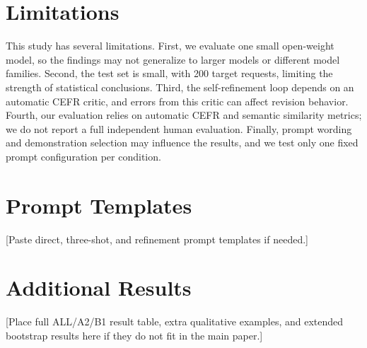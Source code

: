 \documentclass[11pt]{article}
\begin{document}
\section*{Limitations}

This study has several limitations. First, we evaluate one small open-weight model, so the findings may not generalize to larger models or different model families. Second, the test set is small, with 200 target requests, limiting the strength of statistical conclusions. Third, the self-refinement loop depends on an automatic CEFR critic, and errors from this critic can affect revision behavior. Fourth, our evaluation relies on automatic CEFR and semantic similarity metrics; we do not report a full independent human evaluation. Finally, prompt wording and demonstration selection may influence the results, and we test only one fixed prompt configuration per condition.



\appendix

\section{Prompt Templates}
[Paste direct, three-shot, and refinement prompt templates if needed.]

\section{Additional Results}
[Place full ALL/A2/B1 result table, extra qualitative examples, and extended bootstrap results here if they do not fit in the main paper.]
\end{document}
